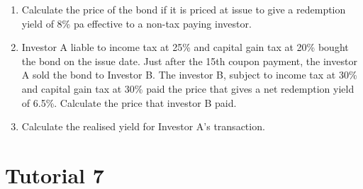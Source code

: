 \documentclass[
]{article}
\theoremstyle{definition}
\theoremstyle{definition}
\theoremstyle{definition}
\theoremstyle{definition}
\theoremstyle{remark}
\begin{document}
\begin{enumerate}
  \begin{enumerate}
  \def\labelenumii{\arabic{enumii}.}
  \item
    Calculate the price of the bond if it is priced at issue to give
    a redemption yield of 8\% pa effective to a non-tax paying
    investor.
  \item
    Investor A liable to income tax at 25\% and capital gain tax at
    20\% bought the bond on the issue date. Just after the 15th
    coupon payment, the investor A sold the bond to Investor B. The
    investor B, subject to income tax at 30\% and capital gain tax at
    30\% paid the price that gives a net redemption yield of 6.5\%.
    Calculate the price that investor B paid.
  \item
    Calculate the realised yield for Investor A's transaction.
  \end{enumerate}
\end{enumerate}

\hypertarget{tutorial-7}{%
\section{Tutorial 7}\label{tutorial-7}}
\end{document}
